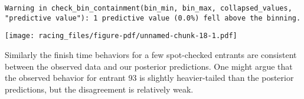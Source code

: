 \documentclass[
  letterpaper,
  DIV=11,
  numbers=noendperiod]{scrartcl}
\newenvironment{Shaded}{\begin{snugshade}}{\end{snugshade}}
\newcommand{\AttributeTok}[1]{\textcolor[rgb]{0.40,0.45,0.13}{#1}}
\newcommand{\ControlFlowTok}[1]{\textcolor[rgb]{0.00,0.23,0.31}{#1}}
\newcommand{\DecValTok}[1]{\textcolor[rgb]{0.68,0.00,0.00}{#1}}
\newcommand{\FunctionTok}[1]{\textcolor[rgb]{0.28,0.35,0.67}{#1}}
\newcommand{\NormalTok}[1]{\textcolor[rgb]{0.00,0.23,0.31}{#1}}
\newcommand{\OtherTok}[1]{\textcolor[rgb]{0.00,0.23,0.31}{#1}}
\newcommand{\SpecialCharTok}[1]{\textcolor[rgb]{0.37,0.37,0.37}{#1}}
\newcommand{\StringTok}[1]{\textcolor[rgb]{0.13,0.47,0.30}{#1}}
\begin{document}
\begin{verbatim}
Warning in check_bin_containment(bin_min, bin_max, collapsed_values,
"predictive value"): 1 predictive value (0.0%) fell above the binning.
\end{verbatim}

\texttt{[image: racing\_files/figure-pdf/unnamed-chunk-18-1.pdf]}

Similarly the finish time behaviors for a few spot-checked entrants are
consistent between the observed data and our posterior predictions. One
might argue that the observed behavior for entrant 93 is slightly
heavier-tailed than the posterior predictions, but the disagreement is
relatively weak.

\begin{Shaded}
\end{Shaded}
\end{document}
